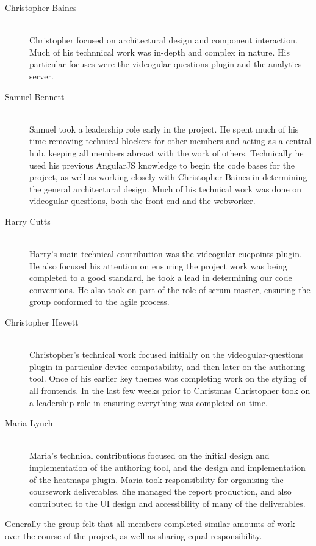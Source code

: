 \begin{description}
  \item[Christopher Baines] \hfill \\
    Christopher focused on architectural design and component interaction. Much of his technnical work was in-depth and complex in nature. His particular focuses were the videogular-questions plugin and the analytics server.
  \item[Samuel Bennett] \hfill \\
    Samuel took a leadership role early in the project. He spent much of his time removing technical blockers for other members and acting as a central hub, keeping all members abreast with the work of others. Technically he used his previous AngularJS knowledge to begin the code bases for the project, as well as working closely with Christopher Baines in determining the general architectural design. Much of his technical work was done on videogular-questions, both the front end and the webworker.
  \item[Harry Cutts] \hfill \\
    Harry's main technical contribution was the videogular-cuepoints plugin. He also focused his attention on ensuring the project work was being completed to a good standard, he took a lead in determining our code conventions. He also took on part of the role of scrum master, ensuring the group conformed to the agile process.
  \item[Christopher Hewett] \hfill \\
    Christopher's technical work focused initially on the videogular-questions plugin in particular device compatability, and then later on the authoring tool. Once of his earlier key themes was completing work on the styling of all frontends. In the last few weeks prior to Christmas Christopher took on a leadership role in ensuring everything was completed on time.
  \item[Maria Lynch] \hfill \\
    Maria's technical contributions focused on the initial design and implementation of the authoring tool, and the design and implementation of the heatmaps plugin. Maria took responsibility for organising the coursework deliverables. She managed the report production, and also contributed to the UI design and accessibility of many of the deliverables.
\end{description}

Generally the group felt that all members completed similar amounts of work over the course of the project, as well as sharing equal responsibility.

